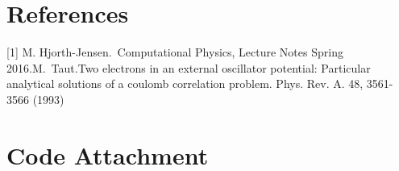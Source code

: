 \documentclass[11pt,a4wide]{article}
\begin{document}
\section{References}
[1] M. Hjorth-Jensen.~Computational Physics, Lecture Notes Spring 2016.\break
[2] M.~Taut.Two electrons in an external oscillator potential: Particular analytical solutions of a coulomb correlation problem. Phys. Rev. A. 48, 3561-3566 (1993)

\section{Code Attachment}

\end{document}
